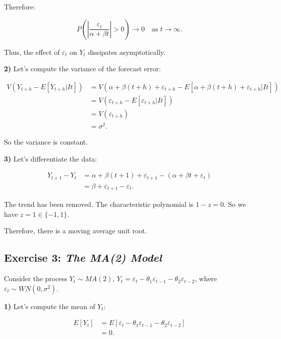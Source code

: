 \documentclass[
  a4paper]{article}
\begin{document}
Therefore:

\[
P\left(\left|\frac{\varepsilon_t}{\alpha + \beta t}\right| > 0\right) \to 0 \quad \text{as } t \to \infty.
\]

Thus, the effect of \(\varepsilon_t\) on \(Y_t\) dissipates
asymptotically.

\textbf{2)} Let's compute the variance of the forecast error:

\begin{align*}
V(Y_{t+h} - E[Y_{t+h} | It]) & = V(\alpha + \beta(t+h) + \varepsilon_{t+h} - E[\alpha + \beta(t+h) + \varepsilon_{t+h} | It]) \\
                        & = V(\varepsilon_{t+h} - E[\varepsilon_{t+h} | It]) \\
                        & = V(\varepsilon_{t+h}) \\
                        & = \sigma^2.
\end{align*}

So the variance is constant.

\textbf{3)} Let's differentiate the data:

\begin{align*}
Y_{t+1} - Y_t & = \alpha + \beta(t+1) + \varepsilon_{t+1} - (\alpha + \beta t + \varepsilon_t) \\
              & = \beta + \varepsilon_{t+1} - \varepsilon_t.
\end{align*}

The trend has been removed. The characteristic polynomial is
\(1 - z = 0\). So we have \(z = 1 \in \{-1, 1\}\).

Therefore, there is a moving average unit root.

\hypertarget{exercise-3-the-ma2-model}{%
\subsection{\texorpdfstring{Exercise 3: \emph{The MA(2)
Model}}{Exercise 3: The MA(2) Model}}\label{exercise-3-the-ma2-model}}

Consider the process \(Y_t \sim MA(2)\),
\(Y_t = \varepsilon_t - \theta_1 \varepsilon_{t-1} - \theta_2 \varepsilon_{t-2}\),
where \(\varepsilon_t \sim WN(0, \sigma^2)\).

\textbf{1)} Let's compute the mean of \(Y_t\):

\begin{align*}
E[Y_t] & = E[\varepsilon_t - \theta_1 \varepsilon_{t-1} - \theta_2 \varepsilon_{t-2}] \\
       & = 0.
\end{align*}
\end{document}
